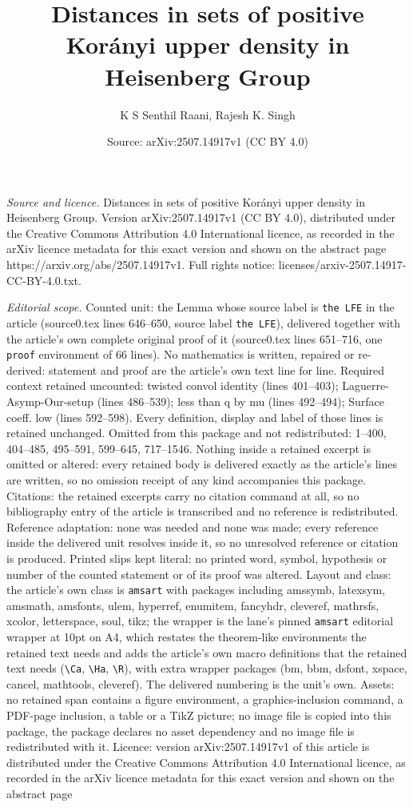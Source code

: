\documentclass[10pt,a4paper]{amsart}
\title[Distances in sets of positive Kor\'anyi upper density in Hei]{Distances in sets of positive Kor\'anyi upper density in Heisenberg Group}
\author{K S Senthil Raani, Rajesh K. Singh}
\date{Source: arXiv:2507.14917v1 (CC BY 4.0)}
\begin{document}
\maketitle

\noindent\emph{Source and licence.} Distances in sets of positive Kor\'anyi upper density in Heisenberg Group. Version arXiv:2507.14917v1 (CC BY 4.0), distributed under the Creative Commons Attribution 4.0 International licence, as recorded in the arXiv licence metadata for this exact version and shown on the abstract page https://arxiv.org/abs/2507.14917v1. Full rights notice: licenses/arxiv-2507.14917-CC-BY-4.0.txt.\par\smallskip

\noindent\textit{Editorial scope.} Counted unit: the Lemma whose source label is \texttt{the LFE} in the article (source0.tex lines 646--650, source label \texttt{the LFE}), delivered together with the article's own complete original proof of it (source0.tex lines 651--716, one \texttt{proof} environment of 66 lines). No mathematics is written, repaired or re-derived: statement and proof are the article's own text line for line. Required context retained uncounted: twisted convol identity (lines 401--403); Laguerre-Asymp-Our-setup (lines 486--539); less than q by mu (lines 492--494); Surface coeff. low (lines 592--598). Every definition, display and label of those lines is retained unchanged. Omitted from this package and not redistributed: 1--400, 404--485, 495--591, 599--645, 717--1546. Nothing inside a retained excerpt is omitted or altered: every retained body is delivered exactly as the article's lines are written, so no omission receipt of any kind accompanies this package. Citations: the retained excerpts carry no citation command at all, so no bibliography entry of the article is transcribed and no reference is redistributed. Reference adaptation: none was needed and none was made; every reference inside the delivered unit resolves inside it, so no unresolved reference or citation is produced. Printed slips kept literal: no printed word, symbol, hypothesis or number of the counted statement or of its proof was altered. Layout and class: the article's own class is \texttt{amsart} with packages including amssymb, latexsym, amsmath, amsfonts, ulem, hyperref, enumitem, fancyhdr, cleveref, mathrsfs, xcolor, letterspace, soul, tikz; the wrapper is the lane's pinned \texttt{amsart} editorial wrapper at 10pt on A4, which restates the theorem-like environments the retained text needs and adds the article's own macro definitions that the retained text needs (\texttt{\textbackslash Ca}, \texttt{\textbackslash Ha}, \texttt{\textbackslash R}), with extra wrapper packages (bm, bbm, dsfont, xspace, cancel, mathtools, cleveref). The delivered numbering is the unit's own. Assets: no retained span contains a figure environment, a graphics-inclusion command, a PDF-page inclusion, a table or a TikZ picture; no image file is copied into this package, the package declares no asset dependency and no image file is redistributed with it. Licence: version arXiv:2507.14917v1 of this article is distributed under the Creative Commons Attribution 4.0 International licence, as recorded in the arXiv licence metadata for this exact version and shown on the abstract page 
\end{document}
